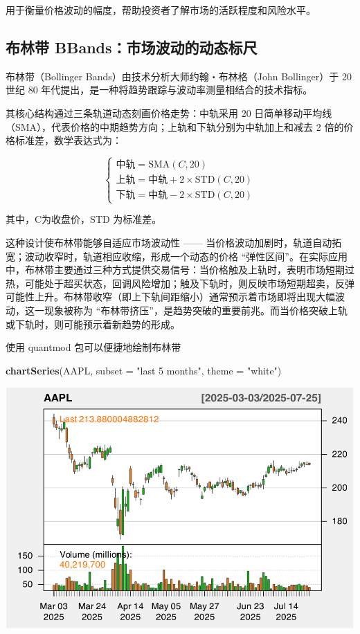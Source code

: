 \documentclass[]{ctexbook}
\newenvironment{Shaded}{\begin{snugshade}}{\end{snugshade}}
\newcommand{\AttributeTok}[1]{\textcolor[rgb]{0.13,0.29,0.53}{#1}}
\newcommand{\FunctionTok}[1]{\textcolor[rgb]{0.13,0.29,0.53}{\textbf{#1}}}
\newcommand{\NormalTok}[1]{#1}
\newcommand{\StringTok}[1]{\textcolor[rgb]{0.31,0.60,0.02}{#1}}
\begin{document}
用于衡量价格波动的幅度，帮助投资者了解市场的活跃程度和风险水平。

\subsection{布林带 BBands：市场波动的动态标尺}\label{ux5e03ux6797ux5e26-bbandsux5e02ux573aux6ce2ux52a8ux7684ux52a8ux6001ux6807ux5c3a}

布林带（Bollinger Bands）由技术分析大师约翰・布林格（John Bollinger）于 20 世纪 80 年代提出，是一种将趋势跟踪与波动率测量相结合的技术指标。

其核心结构通过三条轨道动态刻画价格走势：中轨采用 20 日简单移动平均线（SMA），代表价格的中期趋势方向；上轨和下轨分别为中轨加上和减去 2 倍的价格标准差，数学表达式为：

\[
\begin{cases}
\text{中轨} = \text{SMA}(C, 20) \\
\text{上轨} = \text{中轨} + 2 \times \text{STD}(C, 20) \\
\text{下轨} = \text{中轨} - 2 \times \text{STD}(C, 20)
\end{cases}
\]

其中，C为收盘价，\(\text{STD}\) 为标准差。

这种设计使布林带能够自适应市场波动性 ------ 当价格波动加剧时，轨道自动拓宽；波动收窄时，轨道相应收缩，形成一个动态的价格 ``弹性区间''。在实际应用中，布林带主要通过三种方式提供交易信号：当价格触及上轨时，表明市场短期过热，可能处于超买状态，回调风险增加；触及下轨时，则反映市场短期超卖，反弹可能性上升。布林带收窄（即上下轨间距缩小）通常预示着市场即将出现大幅波动，这一现象被称为 ``布林带挤压''，是趋势突破的重要前兆。而当价格突破上轨或下轨时，则可能预示着新趋势的形成。

使用 quantmod 包可以便捷地绘制布林带

\begin{Shaded}
\begin{Highlighting}[]
\FunctionTok{chartSeries}\NormalTok{(AAPL, }\AttributeTok{subset =} \StringTok{"last 5 months"}\NormalTok{, }\AttributeTok{theme =} \StringTok{"white"}\NormalTok{)  }
\end{Highlighting}
\end{Shaded}

\includegraphics[width=0.9\linewidth]{QuantmodHandbook_files/figure-latex/bb-1}
\end{document}
